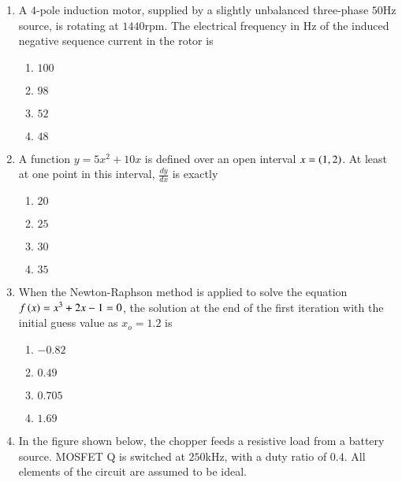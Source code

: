 \documentclass[journal]{IEEEtran}
\begin{document}
\begin{enumerate}
{\begin{figure}[H]
\label{fig:my_label}
\end{figure}
\begin{multicols}{4}
\begin{enumerate}
\item $10\mu s$
\item $50\mu s$
\item $100\mu s$
\item $200\mu s$
\end{enumerate}
\end{multicols}
}
\item{
A $4$-pole induction motor, supplied by a slightly unbalanced three-phase $50$Hz source, is rotating at $1440$rpm. The electrical frequency in Hz of the induced negative sequence current in the rotor is
\begin{multicols}{4}
\begin{enumerate}
\item $100$
\item $98$
\item $52$
\item $48$
\end{enumerate}
\end{multicols}
}
\item{
A function $y=5x^2+10x$ is defined over an open interval $x=\left(1,2\right)$. At least at one point in this interval, $\frac{dy}{dx}$ is exactly
\begin{multicols}{4}
\begin{enumerate}
\item $20$
\item $25$
\item $30$
\item $35$
\end{enumerate}
\end{multicols}
}
\item{
When the Newton-Raphson method is applied to solve the equation $f\left(x\right)=x^3+2x-1=0$, the solution at the end of the first iteration with the initial guess value as $x_o=1.2$ is
\begin{multicols}{4}
\begin{enumerate}
\item $-0.82$
\item $0.49$
\item $0.705$
\item $1.69$
\end{enumerate}
\end{multicols}
}
\item{
In the figure shown below, the chopper feeds a resistive load from a battery source. MOSFET Q is switched at $250$kHz, with a duty ratio of $0.4$. All elements of the circuit are assumed to be ideal.
}
\end{enumerate}
\end{document}
